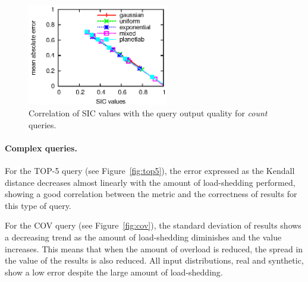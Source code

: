 \begin{figure}
\centering
\includegraphics[width=0.55\textwidth]{img/tesi/count1}
\caption{Correlation of SIC values with the query output quality for \emph{count} queries.}
\label{fig:agg-count}
\end{figure}
\paragraph{Complex queries.}
For the \textnormal{TOP-5} query (see Figure~\ref{fig:top5}), the error expressed as the Kendall distance
decreases almost linearly with the amount of \mbox{load-shedding} performed, showing a good correlation
between the \sic metric and the correctness of results for this type of query. 

For the \textnormal{COV} query (see Figure~\ref{fig:cov}), the standard deviation of results shows a
decreasing trend as the amount of \mbox{load-shedding} diminishes and the \sic value increases. This means that
when the amount of overload is reduced, the spread in the value of the results is also reduced.
All input distributions, real and synthetic, show a low error despite the large amount of
\mbox{load-shedding}. 


